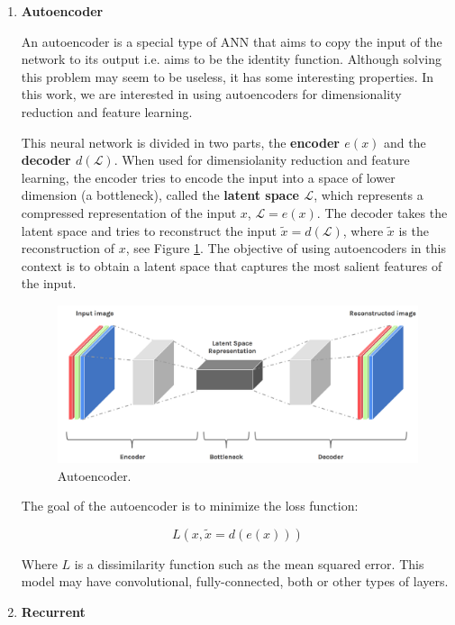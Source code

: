 \begin{enumerate}
    \item \textbf{Autoencoder}
    
An autoencoder is a special type of ANN that aims to copy the input of the network to its output i.e. aims to be the identity function. Although solving this problem may seem to be useless, it has some interesting properties. In this work, we are interested in using autoencoders for dimensionality reduction and feature learning. 

This neural network is divided in two parts, the \textbf{encoder $e(x)$} and the \textbf{decoder $d(\mathcal{L})$}. When used for dimensiolanity reduction and feature learning, the encoder tries to encode the input into a space of lower dimension (a bottleneck), called the \textbf{latent space $\mathcal{L}$}, which represents a compressed representation of the input $x$, $\mathcal{L}=e(x)$. The decoder takes the latent space and tries to reconstruct the input $\widetilde x = d(\mathcal{L})$, where $\widetilde x$ is the reconstruction of $x$, see Figure \ref{fig:ae}. The objective of using autoencoders in this context is to obtain a latent space that captures the most salient features of the input. 
    
\begin{figure}[H]
    \centering
    \includegraphics[width=0.8\linewidth]{imagenes/cap1/ae.png}
    \caption{Autoencoder.}
    \label{fig:ae}
\end{figure}
    
The goal of the autoencoder is to minimize the loss function:

\begin{equation}
    L(x, \widetilde x = d(e(x)))
\end{equation}

Where $L$ is a dissimilarity function such as the mean squared error. This model may have convolutional, fully-connected, both or other types of layers.
\newline
    \item \textbf{Recurrent}
    

\end{enumerate}

